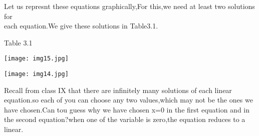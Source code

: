 \documentclass{article}
\begin{document}
\vspace{-1em}
{\fontsize{13}{16}\selectfont Let us represnt these equations graphically,For this,we need at least two solutions for \\
each equation.We give these solutions in Table3.1.}

\center \textcolor{ncertcyan}{\large Table 3.1}

\begin{minipage}{0.3\textwidth}
    \texttt{[image: img15.jpg]}
\end{minipage}
\hspace{0.05\textwidth}
\begin{minipage}{0.5\textwidth}
    \texttt{[image: img14.jpg]} 
\end{minipage}

\justify
{\fontsize{13}{16}\selectfont 
\hspace{1em}Recall from class IX that there are infinitely many solutions of each linear equation.so each of you can choose any 
two values,which may not be the ones we have chosen.Can tou guess why we have chosen x=0 in the first equation and in the second equation?when one of the variable is zero,the equation reduces to a linear.}
\end{document}
